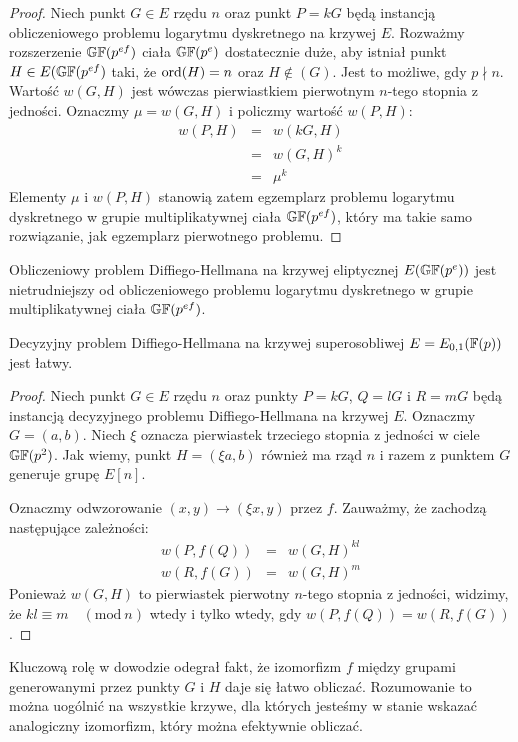 \begin{proof}
Niech punkt $G \in E$ rzędu $n$
oraz punkt $P = kG$ będą instancją
obliczeniowego problemu logarytmu dyskretnego na krzywej $E$.
Rozważmy rozszerzenie $\mathbb{GF}(p^{ef})$ ciała $\mathbb{GF}(p^e)$ dostatecznie duże,
aby istniał punkt $H \in E(\mathbb{GF}(p^{ef})$ taki,
że $\operatorname{ord}(H) = n$ oraz $H \notin (G)$.
Jest to możliwe, gdy $p \nmid n$.
Wartość $w(G, H)$ jest wówczas
pierwiastkiem pierwotnym $n$-tego stopnia z jedności.
Oznaczmy $\mu = w(G, H)$ i policzmy wartość $w(P, H)$:
\begin{eqnarray*}
w(P, H)
& = & w(kG, H) \\
& = & w(G, H)^k \\
& = & \mu^k
\end{eqnarray*}
Elementy $\mu$ i $w(P, H)$ stanowią zatem
egzemplarz problemu logarytmu dyskretnego
w grupie multiplikatywnej ciała $\mathbb{GF}(p^{ef})$,
który ma takie samo rozwiązanie, jak egzemplarz pierwotnego problemu.
\end{proof}

\begin{corollary}
Obliczeniowy problem Diffiego-Hellmana na krzywej eliptycznej $E(\mathbb{GF}(p^e))$
jest nietrudniejszy od obliczeniowego problemu logarytmu dyskretnego
w grupie multiplikatywnej ciała $\mathbb{GF}(p^{ef})$.
\end{corollary}

\begin{theorem}
Decyzyjny problem Diffiego-Hellmana
na krzywej superosobliwej $E = E_{0,1}(\mathbb{F}(p))$
jest łatwy.
\end{theorem}

\begin{proof}
Niech punkt $G \in E$ rzędu $n$
oraz punkty $P = kG$, $Q = lG$ i $R = mG$
będą instancją decyzyjnego problemu Diffiego-Hellmana na krzywej $E$.
Oznaczmy $G = (a, b)$.
Niech $\xi$ oznacza pierwiastek trzeciego stopnia z jedności w ciele $\mathbb{GF}(p^2)$.
Jak wiemy, punkt $H = (\xi a, b)$ również ma rząd $n$
i razem z punktem $G$ generuje grupę $E[n]$.

Oznaczmy odwzorowanie $(x, y) \to (\xi x, y)$ przez $f$.
Zauważmy, że zachodzą następujące zależności:
\begin{eqnarray*}
w(P, f(Q)) & = & w(G, H)^{kl} \\
w(R, f(G)) & = & w(G, H)^m
\end{eqnarray*}
Ponieważ $w(G, H)$ to pierwiastek pierwotny $n$-tego stopnia z jedności,
widzimy, że $kl \equiv m \quad (\mathrm{mod}\ n)$ wtedy i tylko wtedy, gdy
$w(P, f(Q)) = w(R, f(G))$.
\end{proof}

\begin{remark}
Kluczową rolę w dowodzie odegrał fakt, że izomorfizm $f$
między grupami generowanymi przez punkty $G$ i $H$ daje się łatwo obliczać.
Rozumowanie to można uogólnić na wszystkie krzywe,
dla których jesteśmy w stanie wskazać analogiczny izomorfizm,
który można efektywnie obliczać.
\end{remark}
